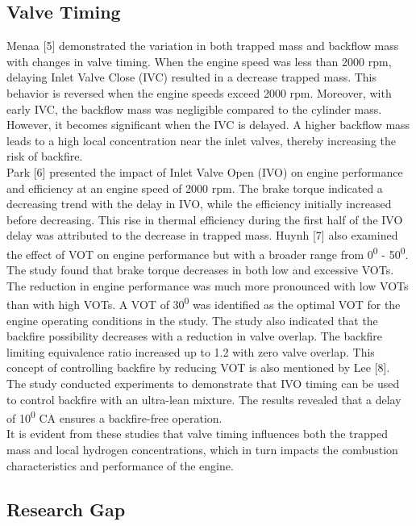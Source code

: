 \documentclass[conference]{IEEEtran}
\begin{document}
\subsection{Valve Timing}

Menaa [5] demonstrated the variation in both trapped mass and backflow mass with changes in valve timing. 
When the engine speed was less than 2000 rpm, delaying Inlet Valve Close (IVC) resulted in a decrease trapped mass. 
This behavior is reversed when the engine speeds exceed 2000 rpm. 
Moreover, with early IVC, the backflow mass was negligible compared to the cylinder mass. 
However, it becomes significant when the IVC is delayed. 
A higher backflow mass leads to a high local concentration near the inlet valves, thereby increasing the risk of backfire.\\

Park [6] presented the impact of Inlet Valve Open (IVO) on engine performance and efficiency at an engine speed of 2000 rpm. 
The brake torque indicated a decreasing trend with the delay in IVO, while the efficiency initially increased before decreasing. 
This rise in thermal efficiency during the first half of the IVO delay was attributed to the decrease in trapped mass. 
Huynh [7] also examined the effect of VOT on engine performance but with a broader range from 0\textsuperscript{0} - 50\textsuperscript{0}. 
The study found that brake torque decreases in both low and excessive VOTs. 
The reduction in engine performance was much more pronounced with low VOTs than with high VOTs. 
A VOT of 30\textsuperscript{0} was identified as the optimal VOT for the engine operating conditions in the study. 
The study also indicated that the backfire possibility decreases with a reduction in valve overlap. 
The backfire limiting equivalence ratio increased up to 1.2 with zero valve overlap. 
This concept of controlling backfire by reducing VOT is also mentioned by Lee [8]. 
The study conducted experiments to demonstrate that IVO timing can be used to control backfire with an ultra-lean mixture. 
The results revealed that a delay of 10\textsuperscript{0} CA ensures a backfire-free operation.\\

It is evident from these studies that valve timing influences both the trapped mass and local hydrogen concentrations, which in turn impacts the combustion characteristics and performance of the engine.

\subsection{Research Gap}
\end{document}
